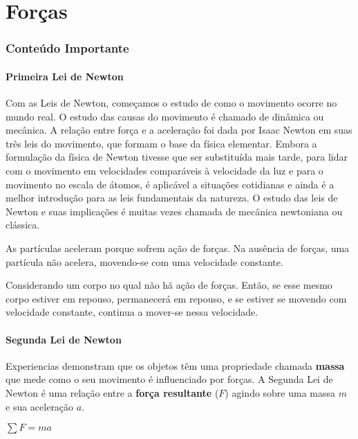 \part{Forças}
\section{Conteúdo Importante}
\subsection{Primeira Lei de Newton}

Com as Leis de Newton, começamos o estudo de como o movimento ocorre no mundo real. O estudo das causas do movimento é chamado de dinâmica ou mecânica. A relação entre força e a aceleração foi dada por Isaac Newton em suas três leis do movimento, que formam o base da física elementar. Embora a formulação da física de Newton tivesse que ser substituída mais tarde, para lidar com o movimento em velocidades comparáveis à velocidade da luz e para o movimento no escala de átomos, é aplicável a situações cotidianas e ainda é a melhor introdução para as leis fundamentais da natureza. O estudo das leis de Newton e suas implicações é muitas vezes chamada de mecânica newtoniana ou clássica.

As partículas aceleram porque sofrem ação de forças. Na ausência de forças, uma partícula não acelera, movendo-se com uma velocidade constante.

\begin{definition} Considerando um corpo no qual não hã ação de forças. Então, se esse mesmo corpo estiver em repouso, permanecerá em repouso, e se estiver se movendo com velocidade constante, continua a mover-se nessa velocidade.
\end{definition}

\subsection{Segunda Lei de Newton}
Experiencias demonstram que os objetos têm uma propriedade chamada \textbf{massa} que mede como o seu movimento é influenciado por forças. A Segunda Lei de Newton é uma relação entre a \textbf{força resultante} ($F$) agindo sobre uma massa $m$ e sua aceleração $a$.

\begin{definition} $\sum F=ma$
\end{definition}

